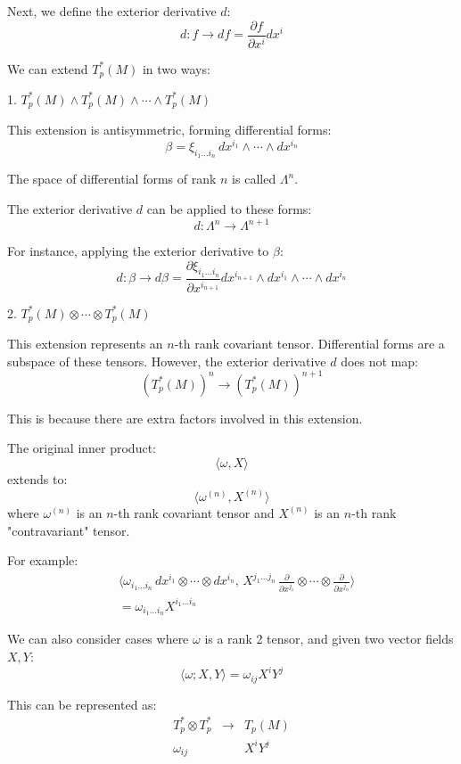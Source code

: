 \documentclass{article}
\begin{document}
Next, we define the exterior derivative \( d \):
\[
d: f \to df = \frac{\partial f}{\partial x^i} dx^i
\]

We can extend \( T_p^*(M) \) in two ways:

1. \( T_p^*(M) \wedge T_p^*(M) \wedge \cdots \wedge T_p^*(M) \)

This extension is antisymmetric, forming differential forms:
\[
\beta = \xi_{i_1 \ldots i_n} \, dx^{i_1} \wedge \cdots \wedge dx^{i_n}
\]

The space of differential forms of rank \( n \) is called \( \Lambda^n \).

The exterior derivative \( d \) can be applied to these forms:
\[
d: \Lambda^n \to \Lambda^{n+1}
\]

For instance, applying the exterior derivative to \(\beta\):
\[
d: \beta \to d\beta = \frac{\partial \xi_{i_1 \ldots i_n}}{\partial x^{i_{n+1}}} dx^{i_{n+1}} \wedge dx^{i_1} \wedge \cdots \wedge dx^{i_n}
\]

2. \( T_p^*(M) \otimes \cdots \otimes T_p^*(M) \)

This extension represents an \( n \)-th rank covariant tensor. Differential forms are a subspace of these tensors. However, the exterior derivative \( d \) does not map:
\[
(T_p^*(M))^n \to (T_p^*(M))^{n+1}
\]

This is because there are extra factors involved in this extension.

The original inner product:
\[
\langle \omega, X \rangle
\]
extends to:
\[
\langle \omega^{(n)}, X^{(n)} \rangle
\]
where \(\omega^{(n)}\) is an \(n\)-th rank covariant tensor and \(X^{(n)}\) is an \(n\)-th rank "contravariant" tensor.

For example:
\begin{align*}
&\langle \omega_{i_1 \ldots i_n} \, dx^{i_1} \otimes \cdots \otimes dx^{i_n}, \, X^{j_1 \ldots j_n} \, \frac{\partial}{\partial x^{j_1}} \otimes \cdots \otimes \frac{\partial}{\partial x^{j_n}} \rangle \\ 
&= \omega_{i_1 \ldots i_n} X^{i_1 \ldots i_n}
\end{align*}

We can also consider cases where \(\omega\) is a rank 2 tensor, and given two vector fields \(X, Y\):
\[
\langle \omega; X, Y \rangle = \omega_{ij} X^i Y^j
\]

This can be represented as:
\[
\begin{array}{ccc}
T_p^* \otimes T_p^* & \longrightarrow & T_p(M) \\
\omega_{ij} & & X^i Y^j
\end{array}
\]
\end{document}
